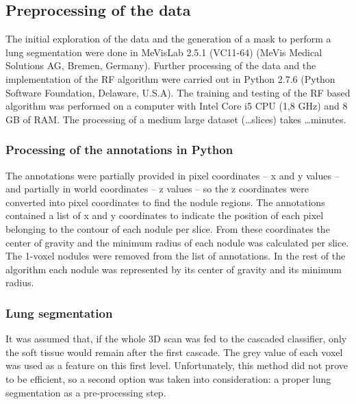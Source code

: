 \subsection{Preprocessing of the data}
The initial exploration of the data and the generation of a mask to perform a
lung segmentation were done in MeVisLab 2.5.1 (VC11-64) (MeVis Medical Solutions
AG, Bremen, Germany). Further processing of the data and the implementation of
the RF algorithm were carried out in Python 2.7.6 (Python Software Foundation,
Delaware, U.S.A).  The training and testing of the RF based algorithm was
performed on a computer with Intel Core i5 CPU (1,8 GHz) and 8 GB of RAM. The
processing of a medium large dataset (\ldots slices) takes \ldots minutes.

\subsubsection{Processing of the annotations in Python}
The annotations were partially provided in pixel coordinates -- x and y values --
and partially in world coordinates -- z values -- so the z coordinates were
converted into pixel coordinates to find the nodule regions. The annotations
contained a list of x and y coordinates to indicate the position of each
pixel belonging to the contour of each nodule per slice. From these
coordinates the center of gravity and the minimum radius of each nodule was
calculated per slice. The 1-voxel nodules were removed from the list of
annotations. In the rest of the algorithm each nodule was represented by its
center of gravity and its minimum radius.

\subsubsection{Lung segmentation}
It was assumed that, if the whole 3D scan was fed to the cascaded classifier,
only the soft tissue would remain after the first cascade. The grey value of
each voxel was used as a feature on this first level.
Unfortunately, this method did not prove to be efficient, so a second option was
taken into consideration: a proper lung segmentation as a pre-processing step.

